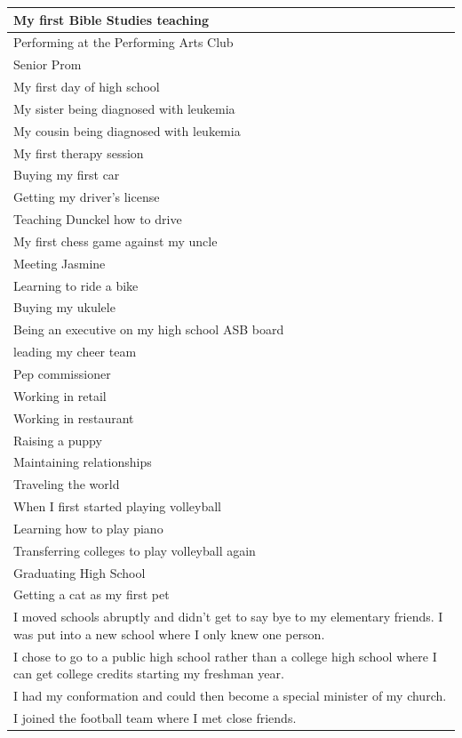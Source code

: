 \documentclass[
  .7em,
  letterpaper,
  DIV=11,
  numbers=noendperiod]{scrartcl}
\begin{document}
\begin{table}
\begin{tabular}{l}
My first Bible Studies teaching\\
\hline
Performing at the Performing Arts Club\\
\hline
Senior Prom\\
\hline
My first day of high school\\
\hline
My sister being diagnosed with leukemia\\
\hline
My cousin being diagnosed with leukemia\\
\hline
My first therapy session\\
\hline
Buying my first car\\
\hline
Getting my driver's license\\
\hline
Teaching Dunckel how to drive\\
\hline
My first chess game against my uncle\\
\hline
Meeting Jasmine\\
\hline
Learning to ride a bike\\
\hline
Buying my ukulele\\
\hline
Being an executive on my high school ASB board\\
\hline
leading my cheer team\\
\hline
Pep commissioner\\
\hline
Working in retail\\
\hline
Working in restaurant\\
\hline
Raising a puppy\\
\hline
Maintaining relationships\\
\hline
Traveling the world\\
\hline
When I first started playing volleyball\\
\hline
Learning how to play piano\\
\hline
Transferring colleges to play volleyball again\\
\hline
Graduating High School\\
\hline
Getting a cat as my first pet\\
\hline
I moved schools abruptly and didn't get to say bye to my elementary friends. I was put into a new school where I only knew one person.\\
\hline
I chose to go to a public high school rather than a college high school where I can get college credits starting my freshman year.\\
\hline
I had my conformation and could then become a special minister of my church.\\
\hline
I joined the football team where I met close friends.\\

\end{tabular}
\end{table}
\end{document}
